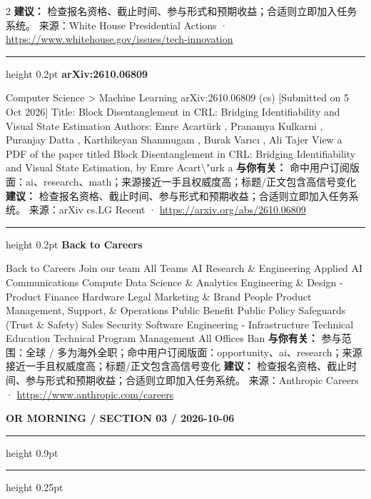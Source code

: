 \documentclass[10.5pt]{ctexart}
\begin{document}
\begin{multicols}{2}
\textbf{建议：} 检查报名资格、截止时间、参与形式和预期收益；合适则立即加入任务系统。
{\footnotesize\color{ormuted} 来源：White House Presidential Actions · \url{https://www.whitehouse.gov/issues/tech-innovation}}
\vspace{2mm}
\hrule height 0.2pt
\vspace{2mm}
{\large\bfseries arXiv:2610.06809}\par
Computer Science > Machine Learning arXiv:2610.06809 (cs) [Submitted on 5 Oct 2026] Title: Block Disentanglement in CRL: Bridging Identifiability and Visual State Estimation Authors: Emre Acartürk , Pranamya Kulkarni , Puranjay Datta , Karthikeyan Shanmugam , Burak Varıcı , Ali Tajer View a PDF of the paper titled Block Disentanglement in CRL: Bridging Identifiability and Visual State Estimation, by Emre Acart\textbackslash{}"urk a
\textbf{与你有关：} 命中用户订阅版面：ai、research、math；来源接近一手且权威度高；标题/正文包含高信号变化
\textbf{建议：} 检查报名资格、截止时间、参与形式和预期收益；合适则立即加入任务系统。
{\footnotesize\color{ormuted} 来源：arXiv cs.LG Recent · \url{https://arxiv.org/abs/2610.06809}}
\vspace{2mm}
\hrule height 0.2pt
\vspace{2mm}
{\large\bfseries Back to Careers}\par
Back to Careers Join our team All Teams AI Research \& Engineering Applied AI Communications Compute Data Science \& Analytics Engineering \& Design - Product Finance Hardware Legal Marketing \& Brand People Product Management, Support, \& Operations Public Benefit Public Policy Safeguards (Trust \& Safety) Sales Security Software Engineering - Infrastructure Technical Education Technical Program Management All Offices Ban
\textbf{与你有关：} 参与范围：全球 / 多为海外全职；命中用户订阅版面：opportunity、ai、research；来源接近一手且权威度高；标题/正文包含高信号变化
\textbf{建议：} 检查报名资格、截止时间、参与形式和预期收益；合适则立即加入任务系统。
{\footnotesize\color{ormuted} 来源：Anthropic Careers · \url{https://www.anthropic.com/careers}}
\end{multicols}
\newpage
{\small\bfseries OR MORNING / SECTION 03 / 2026-10-06}
\vspace{2mm}
\hrule height 0.9pt
\vspace{1.5mm}
\hrule height 0.25pt
\vspace{4mm}
\end{document}
